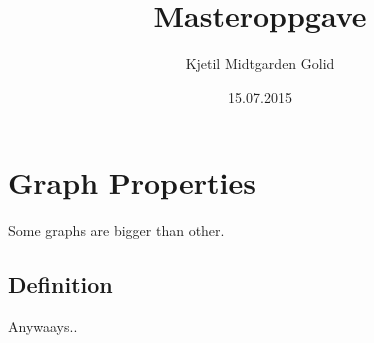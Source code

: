 \documentclass[10pt, a4paper]{article}   	%
\title{Masteroppgave}
\author{Kjetil Midtgarden Golid}
\date{15.07.2015}
\begin{document}
	\maketitle
	\section{Graph Properties}
	Some graphs are bigger than other.
	\subsection{Definition}
	
	Anywaays..
\end{document}
